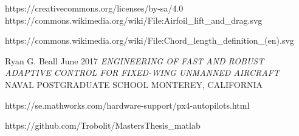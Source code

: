 \documentclass{article}
\begin{document}
\begin{thebibliography}{9}
https://creativecommons.org/licenses/by-sa/4.0
https://commons.wikimedia.org/wiki/File:Airfoil\_lift\_and\_drag.svg

https://commons.wikimedia.org/wiki/File:Chord\_length\_definition\_(en).svg

Ryan G. Beall
June 2017
\textit{ENGINEERING OF FAST AND ROBUST ADAPTIVE
CONTROL FOR FIXED-WING UNMANNED AIRCRAFT}
NAVAL POSTGRADUATE SCHOOL MONTEREY, CALIFORNIA

https://se.mathworks.com/hardware-support/px4-autopilots.html

https://github.com/Trobolit/MastersThesis\_matlab


\end{thebibliography}
\end{document}
